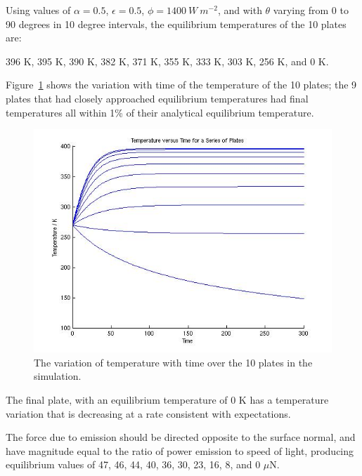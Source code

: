 \begin{description}
    Using values of $\alpha =0.5$,  $\epsilon =0.5$, $\phi =
    1400~W~ m^{-2}$, and with $\theta$ varying from 0 to 90 degrees in 10 degree
    intervals, the equilibrium temperatures of the 10 plates are:

    396 K, 395 K, 390 K, 382 K, 371 K, 355 K, 333 K, 303 K, 256 K, and 0 K.

    Figure~\ref{fig:ivv_F_emission_Tint} shows the variation with time of the
    temperature of the 10 plates; the 9 plates that had closely approached equilibrium temperatures had
    final temperatures all within
    1\% of their analytical equilibrium temperature.

      \begin{figure}[!ht]
        \includegraphics[width=180mm]{figs/Fe_int/temperature-time.jpg}
        \caption{The variation of temperature with time over the 10 plates in
        the simulation.}
        \label{fig:ivv_F_emission_Tint}
      \end{figure}

    The final plate, with an equilibrium temperature of 0 K has a temperature
    variation that is decreasing at a rate consistent with expectations.

    The force due to emission should be directed opposite to the surface
    normal, and have magnitude equal to the ratio of power emission to speed of
    light, producing equilibrium values of 47, 46, 44, 40, 36, 30, 23, 16, 8,
    and 0  ${\mu}$N.


\end{description}
